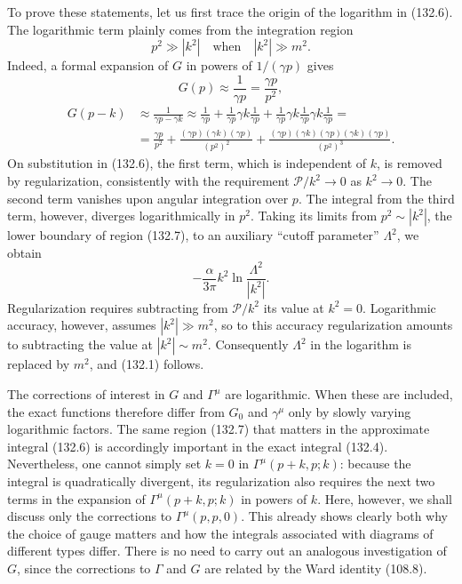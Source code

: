 To prove these statements, let us first trace the origin of the logarithm in (132.6). The logarithmic term plainly comes from the integration region
\begin{equation}
p^2\gg|k^2|\quad\text{when}\quad |k^2|\gg m^2.
\tag{132.7}
\end{equation}
Indeed, a formal expansion of $G$ in powers of $1/(\gamma p)$ gives
\[
G(p)\approx\frac{1}{\gamma p}=\frac{\gamma p}{p^2},
\]
\[
\begin{aligned}
G(p-k)&\approx\frac{1}{\gamma p-\gamma k}\approx
\frac{1}{\gamma p}+\frac{1}{\gamma p}\gamma k\frac{1}{\gamma p}
+\frac{1}{\gamma p}\gamma k\frac{1}{\gamma p}\gamma k\frac{1}{\gamma p}=\\
&=\frac{\gamma p}{p^2}+\frac{(\gamma p)(\gamma k)(\gamma p)}{(p^2)^2}
+\frac{(\gamma p)(\gamma k)(\gamma p)(\gamma k)(\gamma p)}{(p^2)^3}.
\end{aligned}
\]
On substitution in (132.6), the first term, which is independent of $k$, is removed by regularization, consistently with the requirement $\mathcal P/k^2\to0$ as $k^2\to0$. The second term vanishes upon angular integration over $p$. The integral from the third term, however, diverges logarithmically in $p^2$. Taking its limits from $p^2\sim|k^2|$, the lower boundary of region (132.7), to an auxiliary ``cutoff parameter'' $\Lambda^2$, we obtain
\begin{equation}
-\frac{\alpha}{3\pi}k^2\ln\frac{\Lambda^2}{|k^2|}.
\tag{132.8}
\end{equation}
Regularization requires subtracting from $\mathcal P/k^2$ its value at $k^2=0$. Logarithmic accuracy, however, assumes
$|k^2|\gg m^2$, so to this accuracy regularization amounts to subtracting the value at $|k^2|\sim m^2$. Consequently $\Lambda^2$ in the logarithm is replaced by $m^2$, and (132.1) follows.

The corrections of interest in $G$ and $\Gamma^\mu$ are logarithmic. When these are included, the exact functions therefore differ from $G_0$ and $\gamma^\mu$ only by slowly varying logarithmic factors. The same region (132.7) that matters in the approximate integral (132.6) is accordingly important in the exact integral (132.4). Nevertheless, one cannot simply set $k=0$ in $\Gamma^\mu(p+k,p;k)$: because the integral is quadratically divergent, its regularization also requires the next two terms in the expansion of $\Gamma^\mu(p+k,p;k)$ in powers of $k$. Here, however, we shall discuss only the corrections to $\Gamma^\mu(p,p,0)$. This already shows clearly both why the choice of gauge matters and how the integrals associated with diagrams of different types differ. There is no need to carry out an analogous investigation of $G$, since the corrections to $\Gamma$ and $G$ are related by the Ward identity (108.8).

